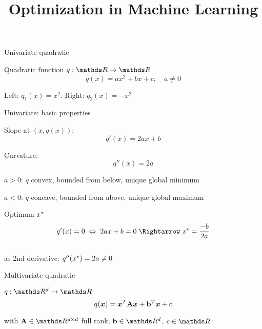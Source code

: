 \documentclass[11pt,compress,t,notes=noshow, xcolor=table]{beamer}
\title{Optimization in Machine Learning}
\begin{document}

\begin{framei}{Univariate quadratic}
\item Quadratic function $q: \R \to \R$
$$ q(x) = a x^2 + b x + c,\quad a \ne 0 $$
\item Left: $q_1(x) = x^2$. Right: $q_2(x) = - x^2$
\end{framei}

\begin{framei}{Univariate: basic properties}
\item Slope at $(x, q(x))$: $$ q'(x) = 2 a x + b $$
\item Curvature: $$ q''(x) = 2 a $$
\item $a > 0$: $q$ convex, bounded from below, unique global minimum
\item $a < 0$: $q$ concave, bounded from above, unique global maximum
\item Optimum $x^\ast$
$$ q'(x) = 0 \;\Leftrightarrow\; 2 a x + b = 0 \;\Rightarrow\; \xs = \frac{-b}{2 a} $$\\
as 2nd derivative: $q''(x^\ast) = 2 a \ne 0$ 
\end{framei}
  
\begin{framei}{Multivariate quadratic}
\item $q: \R^d \to \R$
$$ q(\bm{x}) = \bm{x}^T \mathbf{A} \bm{x} + \mathbf{b}^T \bm{x} + c $$
\item with $\A \in \R^{d \times d}$ full rank, $\bv \in \R^d$, $c \in \R$
\vfill
{}
\end{framei}
\end{document}
